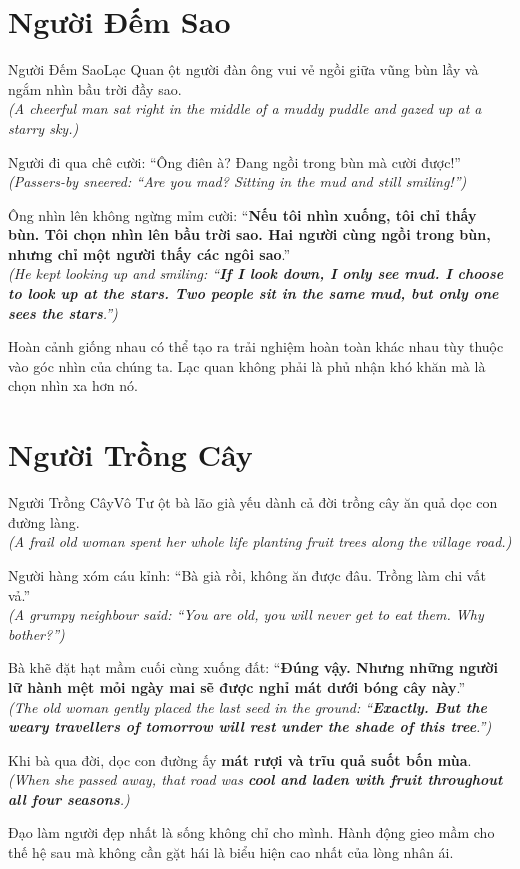 \section{Người Đếm Sao}
\begin{truyen}{Người Đếm Sao}{Lạc Quan}
ột người đàn ông vui vẻ ngồi giữa vũng bùn lầy và ngắm nhìn bầu trời đầy sao.\\
\textit{(A cheerful man sat right in the middle of a muddy puddle and gazed up at a starry sky.)}

Người đi qua chê cười: ``Ông điên à? Đang ngồi trong bùn mà cười được!''\\
\textit{(Passers-by sneered: ``Are you mad? Sitting in the mud and still smiling!'')}

Ông nhìn lên không ngừng mỉm cười: ``\textbf{Nếu tôi nhìn xuống, tôi chỉ thấy bùn. Tôi chọn nhìn lên bầu trời sao. Hai người cùng ngồi trong bùn, nhưng chỉ một người thấy các ngôi sao}.''\\
\textit{(He kept looking up and smiling: ``\textbf{If I look down, I only see mud. I choose to look up at the stars. Two people sit in the same mud, but only one sees the stars}.'')}
\end{truyen}
\begin{baihoc}
  Hoàn cảnh giống nhau có thể tạo ra trải nghiệm hoàn toàn khác nhau tùy thuộc vào góc nhìn của chúng ta. Lạc quan không phải là phủ nhận khó khăn mà là chọn nhìn xa hơn nó.
\end{baihoc}

\section{Người Trồng Cây}
\begin{truyen}{Người Trồng Cây}{Vô Tư}
ột bà lão già yếu dành cả đời trồng cây ăn quả dọc con đường làng.\\
\textit{(A frail old woman spent her whole life planting fruit trees along the village road.)}

Người hàng xóm cáu kỉnh: ``Bà già rồi, không ăn được đâu. Trồng làm chi vất vả.''\\
\textit{(A grumpy neighbour said: ``You are old, you will never get to eat them. Why bother?'')}

Bà khẽ đặt hạt mầm cuối cùng xuống đất: ``\textbf{Đúng vậy. Nhưng những người lữ hành mệt mỏi ngày mai sẽ được nghỉ mát dưới bóng cây này}.''\\
\textit{(The old woman gently placed the last seed in the ground: ``\textbf{Exactly. But the weary travellers of tomorrow will rest under the shade of this tree}.'')}

Khi bà qua đời, dọc con đường ấy \textbf{mát rượi và trĩu quả suốt bốn mùa}.\\
\textit{(When she passed away, that road was \textbf{cool and laden with fruit throughout all four seasons}.)}
\end{truyen}
\begin{baihoc}
  Đạo làm người đẹp nhất là sống không chỉ cho mình. Hành động gieo mầm cho thế hệ sau mà không cần gặt hái là biểu hiện cao nhất của lòng nhân ái.
\end{baihoc}

